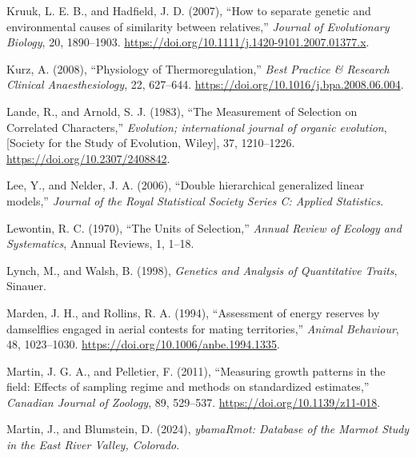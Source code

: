 \documentclass[
  12pt,
  letterpaper,
]{scrartcl}
\newlength{\cslhangindent}
\newenvironment{CSLReferences}[2] %
 {\begin{list}{}{%
  \setlength{\itemindent}{0pt}
  \setlength{\leftmargin}{0pt}
  \setlength{\parsep}{0pt}
  \ifodd #1
   \setlength{\leftmargin}{\cslhangindent}
   \setlength{\itemindent}{-1\cslhangindent}
  \fi
  \setlength{\itemsep}{#2\baselineskip}}}
 {\end{list}}
\begin{document}
\begin{CSLReferences}{1}{0}
Kruuk, L. E. B., and Hadfield, J. D. (2007), {``How to separate genetic
and environmental causes of similarity between relatives,''}
\emph{Journal of Evolutionary Biology}, 20, 1890--1903.
\url{https://doi.org/10.1111/j.1420-9101.2007.01377.x}.

Kurz, A. (2008), {``Physiology of {Thermoregulation},''} \emph{Best
Practice \& Research Clinical Anaesthesiology}, 22, 627--644.
\url{https://doi.org/10.1016/j.bpa.2008.06.004}.

Lande, R., and Arnold, S. J. (1983), {``The {Measurement} of {Selection}
on {Correlated Characters},''} \emph{Evolution; international journal of
organic evolution}, {[}Society for the Study of Evolution, Wiley{]}, 37,
1210--1226. \url{https://doi.org/10.2307/2408842}.

Lee, Y., and Nelder, J. A. (2006), {``Double hierarchical generalized
linear models,''} \emph{Journal of the Royal Statistical Society Series
C: Applied Statistics}.

Lewontin, R. C. (1970), {``The {Units} of {Selection},''} \emph{Annual
Review of Ecology and Systematics}, Annual Reviews, 1, 1--18.

Lynch, M., and Walsh, B. (1998), \emph{Genetics and {Analysis} of
{Quantitative Traits}}, Sinauer.

Marden, J. H., and Rollins, R. A. (1994), {``Assessment of energy
reserves by damselflies engaged in aerial contests for mating
territories,''} \emph{Animal Behaviour}, 48, 1023--1030.
\url{https://doi.org/10.1006/anbe.1994.1335}.

Martin, J. G. A., and Pelletier, F. (2011), {``Measuring growth patterns
in the field: {Effects} of sampling regime and methods on standardized
estimates,''} \emph{Canadian Journal of Zoology}, 89, 529--537.
\url{https://doi.org/10.1139/z11-018}.

Martin, J., and Blumstein, D. (2024), \emph{{ybamaRmot}: {Database} of
the {Marmot Study} in the {East River Valley}, {Colorado}}.


\end{CSLReferences}
\end{document}
